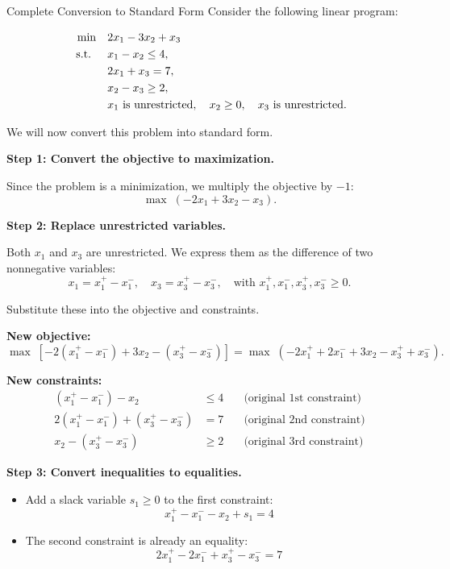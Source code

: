\begin{example}{Complete Conversion to Standard Form}
Consider the following linear program:

\[
\begin{aligned}
\min \quad & 2x_1 - 3x_2 + x_3 \\
\mbox{ s.t. } \quad 
& x_1 - x_2 \leq 4, \\
& 2x_1 + x_3 = 7, \\
& x_2 - x_3 \geq 2, \\
& x_1 \mbox{ is unrestricted}, \quad x_2 \geq 0, \quad x_3 \mbox{ is unrestricted}.
\end{aligned}
\]

We will now convert this problem into standard form.

\medskip
\textbf{Step 1: Convert the objective to maximization.}

Since the problem is a minimization, we multiply the objective by \( -1 \):
\[
\max \; (-2x_1 + 3x_2 - x_3).
\]

\medskip
\textbf{Step 2: Replace unrestricted variables.}

Both \( x_1 \) and \( x_3 \) are unrestricted. We express them as the difference of two nonnegative variables:
\[
x_1 = x_1^+ - x_1^-, \quad x_3 = x_3^+ - x_3^-, \quad \text{with } x_1^+, x_1^-, x_3^+, x_3^- \geq 0.
\]

Substitute these into the objective and constraints.

\smallskip
\textbf{New objective:}
\[
\max \; [-2(x_1^+ - x_1^-) + 3x_2 - (x_3^+ - x_3^-)] = \max \; (-2x_1^+ + 2x_1^- + 3x_2 - x_3^+ + x_3^-).
\]

\smallskip
\textbf{New constraints:}
\begin{align*}
(x_1^+ - x_1^-) - x_2 &\leq 4 \quad &\text{(original 1st constraint)} \\
2(x_1^+ - x_1^-) + (x_3^+ - x_3^-) &= 7 \quad &\text{(original 2nd constraint)} \\
x_2 - (x_3^+ - x_3^-) &\geq 2 \quad &\text{(original 3rd constraint)}
\end{align*}

\medskip
\textbf{Step 3: Convert inequalities to equalities.}

\begin{itemize}
    \item Add a slack variable \( s_1 \geq 0 \) to the first constraint:
    \[
    x_1^+ - x_1^- - x_2 + s_1 = 4
    \]

    \item The second constraint is already an equality:
    \[
    2x_1^+ - 2x_1^- + x_3^+ - x_3^- = 7
    \]


\end{itemize}
\end{example}
